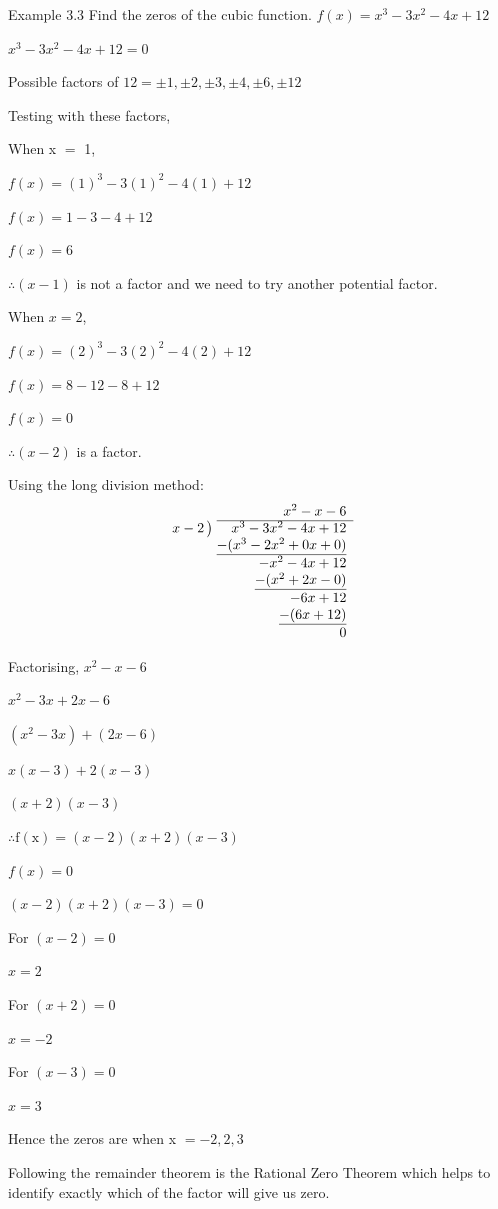 \begin{example}{Example 3.3}
Find the zeros of the cubic function. $f(x) = x^3 - 3x^2 - 4x + 12$

\solution
$x^3 - 3x^2 - 4x + 12 = 0$

Possible factors of $12 = \pm 1, \pm 2, \pm 3, \pm 4, \pm 6, \pm 12$

Testing with these factors,

When x $=$ 1,

$f(x) = (1)^3 - 3(1)^2 - 4(1) + 12$

$f(x) = 1 - 3 - 4 + 12$

$f(x) = 6$

$\therefore (x - 1)$ is not a factor and we need to try another potential factor.

When $x = 2$,

$f(x) = (2)^3 - 3(2)^2 - 4(2) + 12$

$f(x) = 8 - 12 - 8 + 12$

$f(x) = 0$

$\therefore (x - 2)$ is a factor.

Using the long division method:
\[
\begin{array}{r@{\;}r}
 & x^2 - x - 6 \\ \cline{2-2}
x - 2\,\big) & x^3 - 3x^2 - 4x + 12 \\
 & \underline{-(x^3 - 2x^2 + 0x + 0)} \\
 & -x^2 - 4x + 12 \\
 & \underline{-(x^2 + 2x - 0)} \\
 & -6x + 12 \\
 & \underline{-(6x + 12)} \\
 & 0
\end{array}
\]

Factorising, $x^2 - x - 6$

$x^2 - 3x + 2x - 6$

$(x^2 - 3x) + (2x - 6)$

$x(x - 3) + 2(x - 3)$

$(x + 2)(x - 3)$

$\therefore \mathrm{f}(\mathrm{x}) = (x - 2)(x + 2)(x - 3)$

$f(x) = 0$

$(x - 2)(x + 2)(x - 3) = 0$

For $(x - 2) = 0$

$x = 2$

For $(x + 2) = 0$

$x = -2$

For $(x - 3) = 0$

$x = 3$

Hence the zeros are when x $= -2, 2, 3$
\end{example}

Following the remainder theorem is the Rational Zero Theorem which helps to
identify exactly which of the factor will give us zero.
